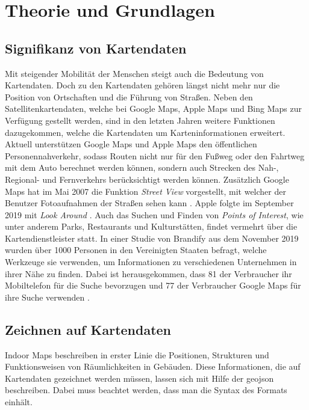 \chapter{Theorie und Grundlagen}
\label{ch:theorybasics}
\section{Signifikanz von Kartendaten}
Mit steigender Mobilität der Menschen steigt auch die Bedeutung von Kartendaten.
Doch zu den Kartendaten gehören längst nicht mehr nur die Position von Ortschaften und die Führung von Straßen.
Neben den Satellitenkartendaten, welche bei Google Maps, Apple Maps und Bing Maps zur Verfügung gestellt werden, sind in den letzten Jahren weitere Funktionen dazugekommen, welche die Kartendaten um Karteninformationen erweitert.
Aktuell unterstützen Google Maps und Apple Maps den öffentlichen Personennahverkehr, sodass Routen nicht nur für den Fußweg oder den Fahrtweg mit dem Auto berechnet werden können, sondern auch Strecken des Nah-, Regional- und Fernverkehrs berücksichtigt werden können.
Zusätzlich Google Maps hat im Mai 2007 die Funktion \emph{Street View} vorgestellt, mit welcher der Benutzer Fotoaufnahmen der Straßen sehen kann \parencite{PUD2007}.
Apple folgte im September 2019 mit \emph{Look Around} \parencite{APP2019}.\pbreak%
%
Auch das Suchen und Finden von \emph{Points of Interest}, wie unter anderem Parks, Restaurants und Kulturstätten, findet vermehrt über die Kartendienstleister statt.
In einer Studie von Brandify aus dem November 2019 wurden über 1000 Personen in den Vereinigten Staaten befragt, welche Werkzeuge sie verwenden, um Informationen zu verschiedenen Unternehmen in ihrer Nähe zu finden.
Dabei ist herausgekommen, dass \SI{81}{\prc} der Verbraucher ihr Mobiltelefon für die Suche bevorzugen und \SI{77}{\prc} der Verbraucher Google Maps für ihre Suche verwenden \parencite{ROL2019}.

\section{Zeichnen auf Kartendaten}
Indoor Maps beschreiben in erster Linie die Positionen, Strukturen und Funktionsweisen von Räumlichkeiten in Gebäuden. Diese Informationen, die auf Kartendaten gezeichnet werden müssen, lassen sich mit Hilfe der \acs{geojson} beschreiben. Dabei muss beachtet werden, dass man die Syntax des Formats einhält.

